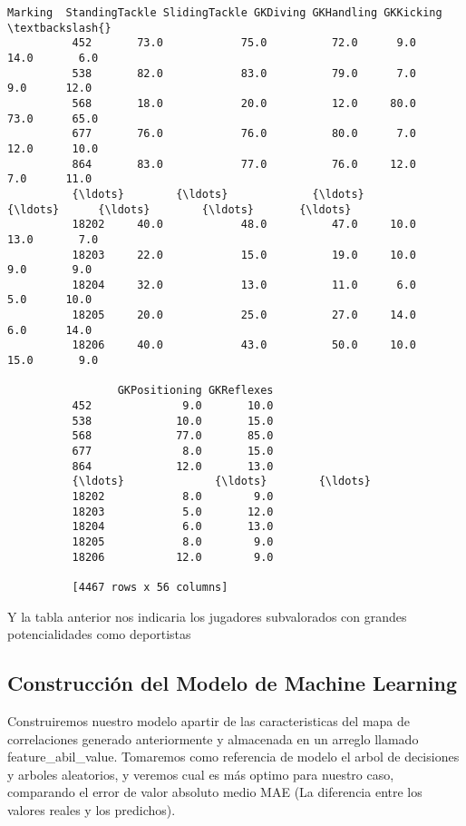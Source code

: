 \documentclass[11pt]{article}
\begin{document}
\begin{Verbatim}[commandchars=\\\{\}]
                 Marking  StandingTackle SlidingTackle GKDiving GKHandling GKKicking  \textbackslash{}
          452       73.0            75.0          72.0      9.0       14.0       6.0   
          538       82.0            83.0          79.0      7.0        9.0      12.0   
          568       18.0            20.0          12.0     80.0       73.0      65.0   
          677       76.0            76.0          80.0      7.0       12.0      10.0   
          864       83.0            77.0          76.0     12.0        7.0      11.0   
          {\ldots}        {\ldots}             {\ldots}           {\ldots}      {\ldots}        {\ldots}       {\ldots}   
          18202     40.0            48.0          47.0     10.0       13.0       7.0   
          18203     22.0            15.0          19.0     10.0        9.0       9.0   
          18204     32.0            13.0          11.0      6.0        5.0      10.0   
          18205     20.0            25.0          27.0     14.0        6.0      14.0   
          18206     40.0            43.0          50.0     10.0       15.0       9.0   
          
                 GKPositioning GKReflexes  
          452              9.0       10.0  
          538             10.0       15.0  
          568             77.0       85.0  
          677              8.0       15.0  
          864             12.0       13.0  
          {\ldots}              {\ldots}        {\ldots}  
          18202            8.0        9.0  
          18203            5.0       12.0  
          18204            6.0       13.0  
          18205            8.0        9.0  
          18206           12.0        9.0  
          
          [4467 rows x 56 columns]
\end{Verbatim}
            
    Y la tabla anterior nos indicaria los jugadores subvalorados con grandes
potencialidades como deportistas

    \hypertarget{construcciuxf3n-del-modelo-de-machine-learning}{%
\subsection{Construcción del Modelo de Machine
Learning}\label{construcciuxf3n-del-modelo-de-machine-learning}}

    Construiremos nuestro modelo apartir de las caracteristicas del mapa de
correlaciones generado anteriormente y almacenada en un arreglo llamado
feature\_abil\_value. Tomaremos como referencia de modelo el arbol de
decisiones y arboles aleatorios, y veremos cual es más optimo para
nuestro caso, comparando el error de valor absoluto medio MAE (La
diferencia entre los valores reales y los predichos).
\end{document}
